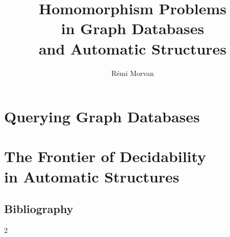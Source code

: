 \documentclass[a4paper,sfsidenotes,twoside,justified,nobib]{tufte-book-custom}
\title[Homomorphism Problems]{Homomorphism Problems\\in Graph Databases\\ and Automatic Structures}
\author{Rémi Morvan}
\begin{document}


\frontmatter

% 
\pagestyle{plain}

\renewcommand\thefigure{P.\arabic{figure}}


% 

\mainmatter
{
	\setcounter{figure}{0}
	\renewcommand\thefigure{R.\arabic{figure}}
	
}

\renewcommand\thefigure{\thechapter.\arabic{figure}}



\part{Querying Graph Databases}
\label{part:databases}







\part[The Frontier of Decidability in Automatic Structures]{The Frontier of Decidability\\in Automatic Structures}
\label{part:automatic}






\begin{fullwidth}
	\let\clearpage\null
	\let\cleardoublepage\null
	\chapter*{Bibliography}
	\setlength{\columnsep}{8mm}
	\begin{multicols}{2}
		\printbibliography[heading=none]
	\end{multicols}
\end{fullwidth}

\printindex
\cleardoublepage

\end{document}
